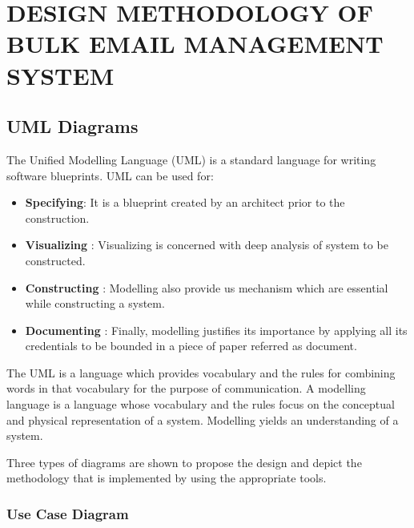 \chapter{DESIGN METHODOLOGY OF BULK EMAIL MANAGEMENT SYSTEM}
\label{design_meth}

\section{UML Diagrams}
The Unified Modelling Language (UML) is a standard language for writing software blueprints. UML can be used for:

\begin{itemize}
  \item \textbf{Specifying}: It is a blueprint created by an architect prior to the construction.
  \item \textbf{Visualizing} : Visualizing is concerned with deep analysis of system to be constructed.
  \item \textbf{Constructing} : Modelling also provide us mechanism which are essential while
constructing a system.
 \item \textbf{Documenting} : Finally, modelling justifies its importance by applying all its credentials
to be bounded in a piece of paper referred as document. 

\end{itemize}

The UML is a language which provides vocabulary and the rules for combining words in that vocabulary for the purpose of communication. A modelling language is a language whose
vocabulary and the rules focus on the conceptual and physical representation of a system. Modelling yields an understanding of a system.

Three types of diagrams are shown to propose the design and depict the methodology that is implemented by using the appropriate tools.

\subsection{Use Case Diagram}


